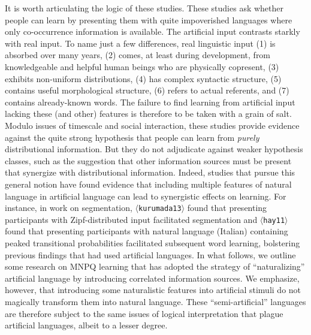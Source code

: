 \documentclass[man,floatsintext]{apa6}
\newcommand{\tcite}[1]{$\langle${\footnotesize \texttt{#1}}$\rangle$}
\newcommand{\cas}[1]{ {\color{blue}  #1} }
\begin{document}
\cas{It is worth articulating the logic of these studies.
These studies ask whether people can learn by presenting them with quite impoverished languages where only co-occurrence information is available.
The artificial input contrasts starkly with real input.
To name just a few differences, real linguistic input (1) is absorbed over many years, (2) comes, at least during development, from knowledgeable and helpful human beings who are physically copresent, (3) exhibits non-uniform distributions, (4) has complex syntactic structure, (5) contains useful morphological structure, (6) refers to actual referents, and (7) contains already-known words.
The failure to find learning from artificial input lacking these (and other) features is therefore to be taken with a grain of salt.
Modulo issues of timescale and social interaction, these studies provide evidence against the quite strong hypothesis that people can learn from \emph{purely} distributional information.
But they do not adjudicate against weaker hypothesis classes, such as the suggestion that other information sources must be present that synergize with distributional information.
Indeed, studies that pursue this general notion have found evidence that including multiple features of natural language in artificial language can lead to synergistic effects on learning.
For instance, in work on segmentation, \tcite{kurumada13} found that presenting participants with Zipf-distributed input facilitated segmentation and \tcite{hay11} found that presenting participants with natural language (Italian) containing peaked transitional probabilities facilitated subsequent word learning, bolstering previous findings that had used artificial languages.
In what follows, we outline some research on MNPQ learning that has adopted the strategy of ``naturalizing'' artificial language by introducing correlated information sources.
We emphasize, however, that introducing some naturalistic features into artificial stimuli do not magically transform them into natural language.
These ``semi-artificial'' languages are therefore subject to the same issues of logical interpretation that plague artificial languages, albeit to a lesser degree.}
\end{document}
